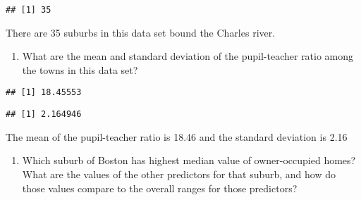 \documentclass[]{article}
\newenvironment{Shaded}{\begin{snugshade}}{\end{snugshade}}
\newcommand{\KeywordTok}[1]{\textcolor[rgb]{0.13,0.29,0.53}{\textbf{#1}}}
\newcommand{\NormalTok}[1]{#1}
\newcommand{\OperatorTok}[1]{\textcolor[rgb]{0.81,0.36,0.00}{\textbf{#1}}}
\providecommand{\tightlist}{%
  \setlength{\itemsep}{0pt}\setlength{\parskip}{0pt}}
\begin{document}
\begin{verbatim}
## [1] 35
\end{verbatim}

There are 35 suburbs in this data set bound the Charles river.

\begin{enumerate}
\def\labelenumi{(\alph{enumi})}
\setcounter{enumi}{5}
\tightlist
\item
  What are the mean and standard deviation of the pupil-teacher ratio
  among the towns in this data set?
\end{enumerate}

\begin{Shaded}
\end{Shaded}

\begin{verbatim}
## [1] 18.45553
\end{verbatim}

\begin{Shaded}
\end{Shaded}

\begin{verbatim}
## [1] 2.164946
\end{verbatim}

The mean of the pupil-teacher ratio is 18.46 and the standard deviation
is 2.16

\begin{enumerate}
\def\labelenumi{(\alph{enumi})}
\setcounter{enumi}{6}
\tightlist
\item
  Which suburb of Boston has highest median value of owner-occupied
  homes? What are the values of the other predictors for that suburb,
  and how do those values compare to the overall ranges for those
  predictors?
\end{enumerate}

\begin{Shaded}
\end{Shaded}
\end{document}
